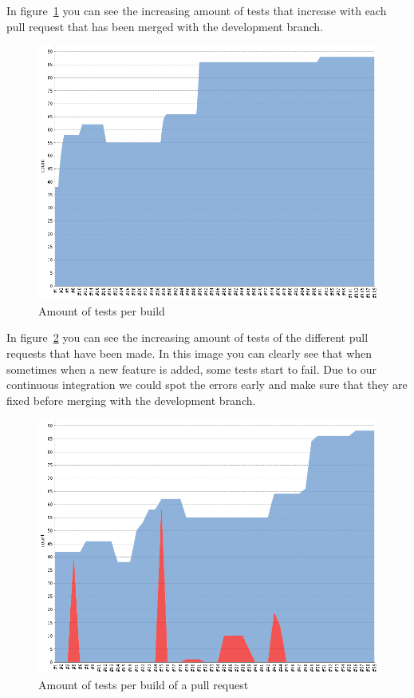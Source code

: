 In figure~\ref{testresulttrenddev} you can see the increasing amount of tests that increase with each pull request that has been merged with the development branch.
\begin{figure}[H]
    \centering
    \includegraphics[width=\textwidth]{images/TestresultTrendDev2}
    \caption{Amount of tests per build}
    \label{testresulttrenddev}
\end{figure}

In figure~\ref{testresulttrendpullrequest} you can see the increasing amount of tests of the different pull requests that have been made.
In this image you can clearly see that when sometimes when a new feature is added, some tests start to fail.
Due to our continuous integration we could spot the errors early and make sure that they are fixed before merging with the development branch.

\begin{figure}[H]
    \centering
    \includegraphics[width=\textwidth]{images/TestresultTrendPullRequests}
    \caption{Amount of tests per build of a pull request}
    \label{testresulttrendpullrequest}
\end{figure}

